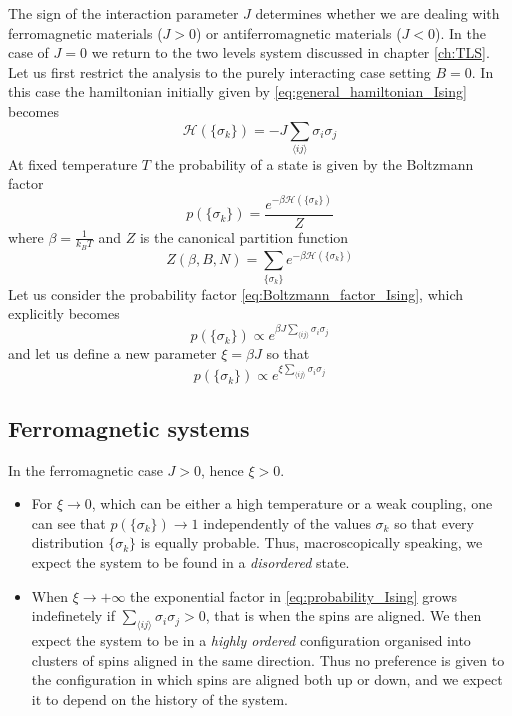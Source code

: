 The sign of the interaction parameter $J$ determines whether we are dealing with ferromagnetic materials ($J>0$) or antiferromagnetic materials ($J < 0$). In the case of $J=0$
we return to the two levels system discussed in chapter \ref{ch:TLS}. \\
Let us first restrict the analysis to the purely interacting case setting $B=0$. In this case the hamiltonian initially given by \ref{eq:general_hamiltonian_Ising} becomes
\begin{equation*}
    \mathcal{H}(\{\sigma_k\}) = -J \sum_{\langle i j\rangle}\sigma_{i} \sigma_{j}
\end{equation*}
At fixed temperature $T$ the probability of a state is given by the Boltzmann factor
\begin{equation}
    p(\{\sigma_k\}) = \frac{e^{-\beta\mathcal{H}(\{\sigma_k\})}}{Z}
    \label{eq:Boltzmann_factor_Ising}
\end{equation}
where $\beta = \frac{1}{k_BT}$ and $Z$ is the canonical partition function
\begin{equation*}
    Z(\beta, B, N) = \sum_{\{\sigma_k\}} e^{-\beta\mathcal{H}(\{\sigma_k\})}
\end{equation*}
Let us consider the probability factor \ref{eq:Boltzmann_factor_Ising}, which explicitly becomes 
\begin{equation*}
    p(\{\sigma_k\}) \propto e^{\beta J \sum_{\langle i j\rangle}\sigma_{i} \sigma_{j}}
\end{equation*}
and let us define a new parameter $\xi = \beta J$ so that 
\begin{equation}
    p(\{\sigma_k\}) \propto e^{\xi \sum_{\langle i j\rangle}\sigma_{i} \sigma_{j}}
    \label{eq:probability_Ising}
\end{equation}

\subsection{Ferromagnetic systems}
\label{subsec:ferromagnetic}
In the ferromagnetic case $J > 0$, hence $\xi > 0$. 
\begin{itemize}
    \item For $\xi \to 0$, which can be either a high temperature or a weak coupling, one can see that 
    $p(\{\sigma_k\}) \to 1$ independently of the values $\sigma_k$ so that every distribution $\{\sigma_k\}$ is equally probable. 
    Thus, macroscopically speaking, we expect the system to be found in a \emph{disordered} state.
    \item When $\xi \to +\infty$ the exponential factor in \ref{eq:probability_Ising} grows indefinetely if $\sum_{\langle i j\rangle}\sigma_{i} \sigma_{j} > 0$, that is when the spins are aligned.
    We then expect the system to be in a \emph{highly ordered} configuration organised into clusters of spins aligned in the same direction.
    Thus no preference is given to the configuration in which spins are aligned both up or down, and we expect it to depend on the history of the system. \\
\end{itemize}
